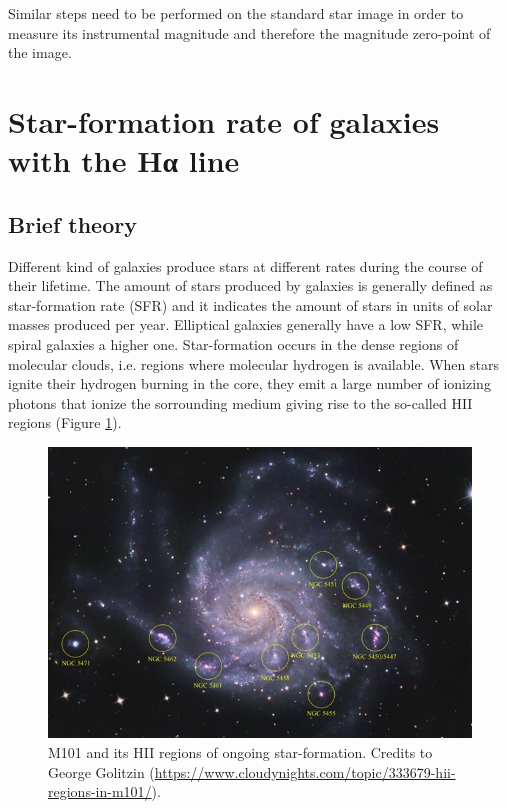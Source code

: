 \documentclass[a4paper, 11pt, fleqn]{memoir}
\begin{document}
Similar steps need to be performed on the standard star image in order to measure its instrumental magnitude and therefore the magnitude zero-point of the image.

\section{Star-formation rate of galaxies with the Hα line}

\subsection{Brief theory}

Different kind of galaxies produce stars at different rates during the course of their lifetime.
The amount of stars produced by galaxies is generally defined as star-formation rate (SFR) and it indicates the amount of stars in units of solar masses produced per year.
Elliptical galaxies generally have a low SFR, while spiral galaxies a higher one.
Star-formation occurs in the dense regions of molecular clouds, i.e. regions where molecular hydrogen is available.
When stars ignite their hydrogen burning in the core, they emit a large number of ionizing photons that ionize the sorrounding medium giving rise to the so-called HII regions (Figure \ref{fig:hiiregions}).

\begin{figure}[t!]
    \centering
    \includegraphics[width=12cm]{m101.jpg}
    \caption{M101 and its HII regions of ongoing star-formation.
        Credits to George Golitzin (\url{https://www.cloudynights.com/topic/333679-hii-regions-in-m101/}).
    }
    \label{fig:hiiregions}
\end{figure}
\end{document}
